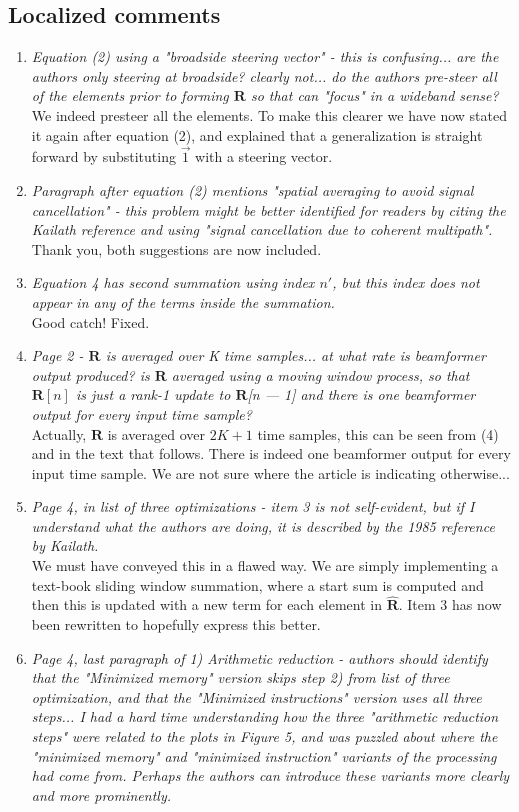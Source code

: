 \documentclass[11pt]{article} %
\newcommand\mat[1]{\boldsymbol{#1}}
\newcommand\1{\vec 1}
\newcommand*\R{\mat R}
\newcommand*\eR{\mat{\hat R}}
\newcommand\q[1]{\textit{#1}}
\newcommand\qi[1]{\item\q{#1}}
\newcommand\ans[1]{#1}
\newcommand\ai[1]{\\[.5\baselineskip]\ans{#1}}
\begin{document}
\subsection{Localized comments}

\begin{enumerate}
\qi{Equation (2) using a "broadside steering vector" - this is confusing... are the authors only steering at broadside? clearly not... do the authors pre-steer all of the elements prior to forming $\R$ so that can "focus" in a wideband sense?}
\ai{We indeed presteer all the elements. To make this clearer we have now stated it again after equation (2), and explained that a generalization is straight forward by substituting $\1$ with a steering vector.}
%
\qi{Paragraph after equation (2) mentions "spatial averaging to avoid signal cancellation" - this problem might be better identified for readers by citing the Kailath reference and using "signal cancellation due to coherent multipath".}
\ai{Thank you, both suggestions are now included.}
%
\qi{Equation 4 has second summation using index $n'$, but this index does not appear in any of the terms inside the summation.}
\ai{Good catch! Fixed.}
%
\qi{Page 2 - $\R$ is averaged over K time samples... at what rate is beamformer output produced? is $\R$ averaged using a moving window process, so that $\R[n]$ is just a rank-1 update to $\R$[n — 1] and there is one beamformer output for every input time sample?}
\ai{Actually, $\R$ is averaged over $2K+1$ time samples, this can be seen from (4) and in the text that follows. There is indeed one beamformer output for every input time sample. We are not sure where the article is indicating otherwise...}
%
\qi{Page 4, in list of three optimizations - item 3 is not self-evident, but if I understand what the authors are doing, it is described by the 1985 reference by Kailath.}
\ai{We must have conveyed this in a flawed way. We are simply implementing a text-book sliding window summation, where a start sum is computed and then this is updated with a new term for each element in $\eR$. Item 3 has now been rewritten to hopefully express this better.}
%
\qi{Page 4, last paragraph of 1) Arithmetic reduction - authors should identify that the "Minimized memory" version skips step 2) from list of three optimization, and that the "Minimized instructions" version uses all three steps... I had a hard time understanding how the three "arithmetic reduction steps" were related to the plots in Figure 5, and was puzzled about where the "minimized memory" and "minimized instruction" variants of the processing had come from. Perhaps the authors can introduce these variants more clearly and more prominently.}

\end{enumerate}
\end{document}
